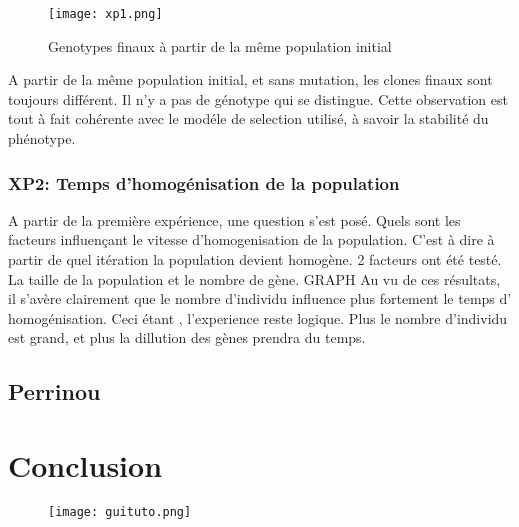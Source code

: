 \documentclass{article}
\begin{document}
	\begin{figure}[h]
	\label{xp1}
	\caption[test]{Genotypes finaux à partir de la même population initial}
	\centering
	\texttt{[image: xp1.png]}
	\end{figure}
	A partir de la même population initial, et sans mutation, les clones finaux sont toujours différent. Il n'y a pas de génotype qui se distingue. Cette observation est tout à fait cohérente avec le modéle de selection utilisé, à savoir la stabilité du phénotype. 

	\subsubsection{XP2: Temps d'homogénisation de la population}
	A partir de la première expérience, une question s'est posé. Quels sont les facteurs influençant le vitesse d'homogenisation de la population. C'est à dire à partir de quel itération la population devient homogène. 
	2 facteurs ont été testé. La taille de la population et le nombre de gène.
	{GRAPH}
	Au vu de ces résultats, il s'avère clairement que le nombre d’individu influence plus fortement le temps d' homogénisation. Ceci étant , l'experience reste logique. Plus le nombre d'individu est grand, et plus la dillution des gènes prendra du temps. 



	\subsection{Perrinou}


	\section {Conclusion}

		\begin{figure}[p]
	\label{figure3}
	\vspace*{-3cm}
	\caption[test]{}
	\texttt{[image: guituto.png]}
	\end{figure}
	
\end{document}
